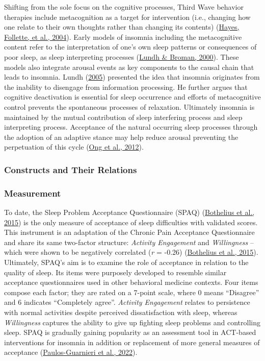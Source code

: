 \documentclass[
  ,doc,11pt, twoside,floatsintext]{apa6}
\begin{document}
Shifting from the sole focus on the cognitive processes, Third Wave behavior therapies include metacognition as a target for intervention (i.e., changing how one relate to their own thoughts rather than changing its contents) (\protect\hyperlink{ref-hayes2004mindfulness}{Hayes, Follette, et al., 2004}). Early models of insomnia including the metacognitive content refer to the interpretation of one's own sleep patterns or consequences of poor sleep, as sleep interpreting processes (\protect\hyperlink{ref-lundh2000}{Lundh \& Broman, 2000}). These models also integrate arousal events as key components to the causal chain that leads to insomnia. Lundh (\protect\hyperlink{ref-lundh2005}{2005}) presented the idea that insomnia originates from the inability to disengage from information processing. He further argues that cognitive deactivation is essential for sleep occurrence and efforts of metacognitive control prevents the spontaneous processes of relaxation. Ultimately insomnia is maintained by the mutual contribution of sleep interfering process and sleep interpreting process. Acceptance of the natural occurring sleep processes through the adoption of an adaptive stance may help reduce arousal preventing the perpetuation of this cycle (\protect\hyperlink{ref-ong2012}{Ong et al., 2012}).

\hypertarget{constructs-and-their-relations-1}{%
\subsubsection{Constructs and Their Relations}\label{constructs-and-their-relations-1}}

\hypertarget{measurement-1}{%
\subsubsection{Measurement}\label{measurement-1}}

To date, the Sleep Problem Acceptance Questionnaire (SPAQ) (\protect\hyperlink{ref-bothelius2015}{Bothelius et al., 2015}) is the only measure of acceptance of sleep difficulties with validated scores. This instrument is an adaptation of the Chronic Pain Acceptance Questionnaire and share its same two-factor structure: \emph{Activity Engagement} and \emph{Willingness} -- which were shown to be negatively correlated (\emph{r} = -0.26) (\protect\hyperlink{ref-bothelius2015}{Bothelius et al., 2015}). Ultimately, SPAQ's aim is to examine the role of acceptance in relation to the quality of sleep. Its items were purposely developed to resemble similar acceptance questionnaires used in other behavioral medicine contexts. Four items compose each factor; they are rated on a 7-point scale, where 0 means ``Disagree'' and 6 indicates ``Completely agree''. \emph{Activity Engagement} relates to persistence with normal activities despite perceived dissatisfaction with sleep, whereas \emph{Willingness} captures the ability to give up fighting sleep problems and controlling sleep. SPAQ is gradually gaining popularity as an assessment tool in ACT-based interventions for insomnia in addition or replacement of more general measures of acceptance (\protect\hyperlink{ref-paulos-guarnieri2022}{Paulos-Guarnieri et al., 2022}).
\end{document}
